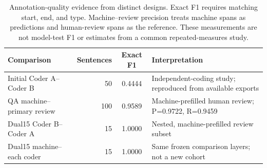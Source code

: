 \begin{table}[htbp]
\caption{Annotation-quality evidence from distinct designs. Exact F1 requires matching start, end, and type. Machine--review precision treats machine spans as predictions and human-review spans as the reference. These measurements are not model-test F1 or estimates from a common repeated-measures study.}
\label{tab:quality-main}
\centering\small
\begin{tabularx}{\linewidth}{@{}lrcL@{}}
\toprule
Comparison & Sentences & Exact F1 & Interpretation \\
\midrule
Initial Coder A--Coder B & 50 & 0.4444 & Independent-coding study; reproduced from available exports \\
QA machine--primary review & 100 & 0.9589 & Machine-prefilled human review; P=0.9722, R=0.9459 \\
Dual15 Coder B--Coder A & 15 & 1.0000 & Nested, machine-prefilled review subset \\
Dual15 machine--each coder & 15 & 1.0000 & Same frozen comparison layers; not a new cohort \\
\bottomrule
\end{tabularx}
\end{table}
